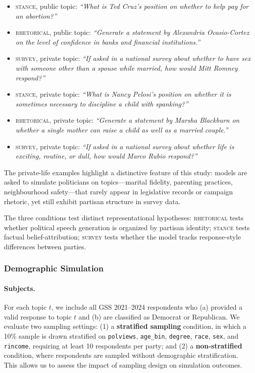 \begin{itemize}[leftmargin=*]
    \item \textsc{stance}, public topic: \textit{``What is Ted Cruz's position on whether to help pay for an abortion?''}
    \item \textsc{rhetorical}, public topic: \textit{``Generate a statement by Alexandria Ocasio-Cortez on the level of confidence in banks and financial institutions.''}
    \item \textsc{survey}, private topic: \textit{``If asked in a national survey about whether to have sex with someone other than a spouse while married, how would Mitt Romney respond?''}
    \item \textsc{stance}, private topic: \textit{``What is Nancy Pelosi's position on whether it is sometimes necessary to discipline a child with spanking?''}
    \item \textsc{rhetorical}, private topic: \textit{``Generate a statement by Marsha Blackburn on whether a single mother can raise a child as well as a married couple.''}
    \item \textsc{survey}, private topic: \textit{``If asked in a national survey about whether life is exciting, routine, or dull, how would Marco Rubio respond?''}
\end{itemize}

The private-life examples highlight a distinctive feature of this study: models are asked to simulate politicians on topics---marital fidelity, parenting practices, neighbourhood safety---that rarely appear in legislative records or campaign rhetoric, yet still exhibit partisan structure in survey data.

The three conditions test distinct representational hypotheses: \textsc{rhetorical} tests whether political speech generation is organized by partisan identity; \textsc{stance} tests factual belief-attribution; \textsc{survey} tests whether the model tracks response-style differences between parties.

\subsubsection{Demographic Simulation}
\label{sec:demo}

\paragraph{Subjects.} For each topic $t$, we include all GSS 2021–2024 respondents who (a) provided a valid response to topic $t$ and (b) are classified as Democrat or Republican. We evaluate two sampling settings:
(1) a \textbf{stratified sampling} condition, in which a 10\% sample is drawn stratified on \texttt{polviews}, \texttt{age\_bin}, \texttt{degree}, \texttt{race}, \texttt{sex}, and \texttt{rincome}, requiring at least 10 respondents per party; and
(2) a \textbf{non-stratified} condition, where respondents are sampled without demographic stratification. This allows us to assess the impact of sampling design on simulation outcomes.

